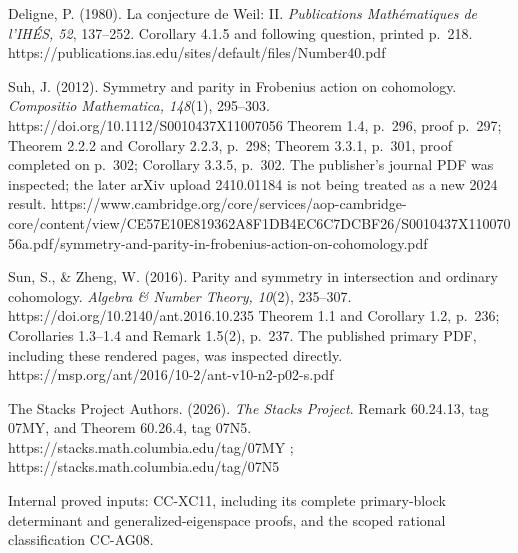 Deligne, P. (1980). La conjecture de Weil: II. \emph{Publications
Mathématiques de l'IHÉS, 52}, 137--252. Corollary 4.1.5 and following
question, printed p.~218.
https://publications.ias.edu/sites/default/files/Number40.pdf

Suh, J. (2012). Symmetry and parity in Frobenius action on cohomology.
\emph{Compositio Mathematica, 148}(1), 295--303.
https://doi.org/10.1112/S0010437X11007056 Theorem 1.4, p.~296, proof
p.~297; Theorem 2.2.2 and Corollary 2.2.3, p.~298; Theorem 3.3.1,
p.~301, proof completed on p.~302; Corollary 3.3.5, p.~302. The
publisher's journal PDF was inspected; the later arXiv upload 2410.01184
is not being treated as a new 2024 result.
https://www.cambridge.org/core/services/aop-cambridge-core/content/view/CE57E10E819362A8F1DB4EC6C7DCBF26/S0010437X11007056a.pdf/symmetry-and-parity-in-frobenius-action-on-cohomology.pdf

Sun, S., \& Zheng, W. (2016). Parity and symmetry in intersection and
ordinary cohomology. \emph{Algebra \& Number Theory, 10}(2), 235--307.
https://doi.org/10.2140/ant.2016.10.235 Theorem 1.1 and Corollary 1.2,
p.~236; Corollaries 1.3--1.4 and Remark 1.5(2), p.~237. The published
primary PDF, including these rendered pages, was inspected directly.
https://msp.org/ant/2016/10-2/ant-v10-n2-p02-s.pdf

The Stacks Project Authors. (2026). \emph{The Stacks Project}. Remark
60.24.13, tag 07MY, and Theorem 60.26.4, tag 07N5.
https://stacks.math.columbia.edu/tag/07MY ;
https://stacks.math.columbia.edu/tag/07N5

Internal proved inputs: CC-XC11, including its complete primary-block
determinant and generalized-eigenspace proofs, and the scoped rational
classification CC-AG08.
